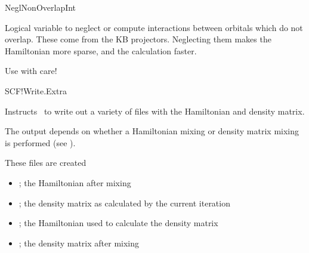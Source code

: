 

\begin{fdflogicalF}{NeglNonOverlapInt}

    Logical variable to neglect or compute interactions between orbitals
    which do not overlap. These come from the KB projectors.  Neglecting
    them makes the Hamiltonian more sparse, and the calculation faster.
  
    \note Use with care!
  
  \end{fdflogicalF}
  
  \begin{fdflogicalF}{SCF!Write.Extra}
  
    Instructs \siesta\ to write out a variety of files with the
    Hamiltonian and density matrix.
  
    The output depends on whether a Hamiltonian mixing or density
    matrix mixing is performed (see ).
  
    These files are created
    \begin{itemize}
      \item {}; the Hamiltonian after
      mixing
  
      \item {}; the density matrix as calculated by the
      current iteration
  
      \item {}; the Hamiltonian used to calculate the
      density matrix
  
      \item {}; the density matrix after mixing
  
    \end{itemize}
  
  \end{fdflogicalF}


